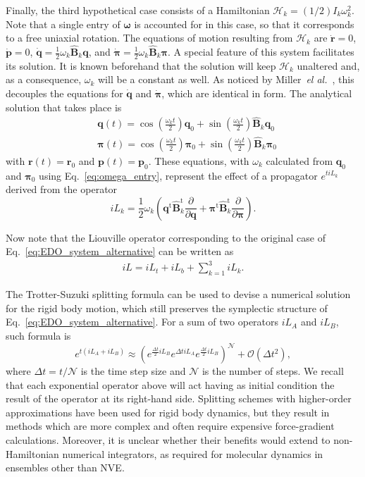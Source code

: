 \documentclass[aip,jcp,reprint,amsmath,amssymb]{revtex4-1}
\newcommand{\mt}[1]{\boldsymbol{\mathbf{#1}}}           %
\newcommand{\vt}[1]{\boldsymbol{\mathbf{#1}}}           %
\newcommand{\tr}[1]{#1^\text{t}}                        %
\newcommand{\diff}[2]{\dfrac{\partial #1}{\partial #2}} %
\begin{document}
Finally, the third hypothetical case consists of a Hamiltonian $\mathcal{H}_k = (1/2) I_k \omega_k^2$. Note that a single entry of $\vt \omega$ is accounted for in this case, so that it corresponds to a free uniaxial rotation. The equations of motion resulting from $\mathcal{H}_k$ are $\dot{\vt r} = 0$, $\dot{\vt p} = 0$, $\dot{\vt q} = \frac{1}{2} \omega_k \hat{\mt B}_k \vt q$, and $\dot{\vt \pi} = \frac{1}{2} \omega_k \hat{\mt B}_k \vt \pi$. A special feature of this system facilitates its solution. It is known beforehand that the solution will keep $\mathcal{H}_k$ unaltered and, as a consequence, $\omega_k$ will be a constant as well. As noticed by Miller~\textit{el al.}~\cite{Miller2002}, this decouples the equations for $\dot{\vt q}$ and $\dot{\vt \pi}$, which are identical in form. The analytical solution that takes place is\cite{Miller2002}
\begin{align*}
&{\vt q}(t) = \cos\left(\frac{\omega_k t}{2}\right) \vt q_0 + \sin\left(\frac{\omega_k t}{2}\right) \hat{\mt B}_k \vt q_0 \\
&{\vt \pi}(t) = \cos\left(\frac{\omega_k t}{2}\right) \vt \pi_0 + \sin\left(\frac{\omega_k t}{2}\right) \hat{\mt B}_k \vt \pi_0
\end{align*}
with ${\vt r}(t) = {\vt r}_0$ and ${\vt p}(t) = {\vt p}_0$. These equations, with $\omega_k$ calculated from $\vt q_0$ and $\vt \pi_0$ using Eq.~\ref{eq:omega_entry}, represent the effect of a propagator $e^{t i\!L_k}$ derived from the operator
\[
i\!L_k = \frac{1}{2} \omega_k \left( \tr{\vt q}\tr{\hat{\mt B}_k} \diff{}{\vt q} + \tr{\vt \pi}\tr{\hat{\mt B}_k} \diff{}{\vt \pi} \right).
\]

Now note that the Liouville operator corresponding to the original case of Eq.~\ref{eq:EDO_system_alternative} can be written as
\begin{align}
\label{eq:full_operator}
i\!L = i\!L_t + i\!L_b + \sum_{k=1}^3 i\!L_k.
\end{align}

The Trotter-Suzuki splitting formula\cite{Trotter1959, Suzuki1976} can be used to devise a numerical solution for the rigid body motion, which still preserves the symplectic structure of Eq.~\ref{eq:EDO_system_alternative}. For a sum of two operators $i\!L_A$ and $i\!L_B$, such formula is
\[
e^{t(i\!L_A + i\!L_B)} \approx \left( e^{\frac{\Delta t}{2} i\!L_B} e^{\Delta t i\!L_A} e^{\frac{\Delta t}{2} i\!L_B} \right)^\mathcal{N} + \mathcal{O}(\Delta t^2),
\]
where $\Delta t = t/\mathcal N$ is the time step size and $\mathcal N$ is the number of steps. We recall that each exponential operator above will act having as initial condition the result of the operator at its right-hand side. Splitting schemes with higher-order approximations have been used for rigid body dynamics,\cite{Omelyan2007, Omelyan2008, vanZon2008} but they result in methods which are more complex and often require expensive force-gradient calculations. Moreover, it is unclear whether their benefits would extend to non-Hamiltonian numerical integrators, as required for molecular dynamics in ensembles other than NVE.
\end{document}
